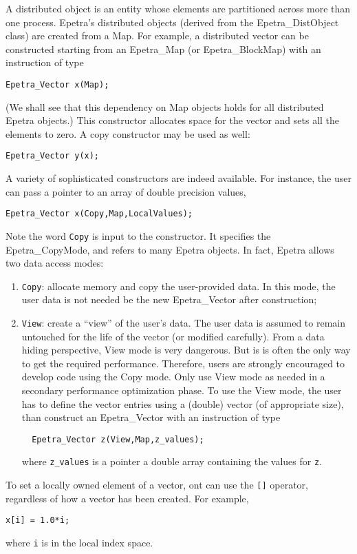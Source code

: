 A distributed object is an entity whose elements are partitioned across
more than one process. Epetra's distributed objects (derived from the
Epetra\_DistObject class) are created from a Map. For example, a
distributed vector can be constructed starting from an Epetra\_Map (or
Epetra\_BlockMap) with an instruction of type
\begin{verbatim}
Epetra_Vector x(Map);
\end{verbatim}
(We shall see that this dependency on Map objects holds for all
distributed Epetra objects.) This constructor allocates space for the
vector and sets all the elements to zero. A copy constructor may be used
as well:
\begin{verbatim}
Epetra_Vector y(x);
\end{verbatim}
A variety of sophisticated constructors are indeed available. For
instance, the user can pass a pointer to an array of double precision
values,
\begin{verbatim}
Epetra_Vector x(Copy,Map,LocalValues);
\end{verbatim}
Note the word \verb!Copy! is input to the constructor. It specifies the
Epetra\_CopyMode, and refers to many Epetra objects. In fact, Epetra
allows two data access modes:
\begin{enumerate}
\item \verb!Copy!: allocate memory and copy the user-provided data. In
  this mode, the user data is not needed be the new Epetra\_Vector after
  construction;
\item \verb!View!: create a ``view'' of the user's data. The user data
  is assumed to remain untouched for the life of the vector (or modified
  carefully). From a data hiding perspective, View mode is very
  dangerous. But is is often the only way to get the required
  performance. Therefore, users are strongly encouraged to develop code
  using the Copy mode. Only use View mode as needed in a secondary
  performance optimization phase. To use the View mode, the user has to
  define the vector entries using a (double) vector (of appropriate
  size), than construct an Epetra\_Vector with an instruction of type
\begin{verbatim}
  Epetra_Vector z(View,Map,z_values);
\end{verbatim}
  where \verb!z_values! is a pointer a double array containing the
  values for \verb!z!.
\end{enumerate}

To set a locally owned element of a vector, ont can use the \verb![]!
operator, regardless of how a vector has been created. For example,
\begin{verbatim}
x[i] = 1.0*i;
\end{verbatim}
where \verb!i! is in the local index space. 

